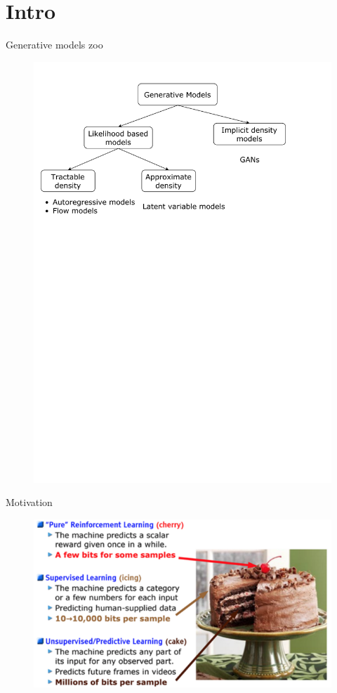 \section{Intro}
\begin{frame}{Generative models zoo}
    \begin{figure}
        \centering
        \includegraphics[width=1.0\linewidth]{figs/generative_models_zoo.pdf}
        \label{fig:generative_models_zoo}
    \end{figure}
\end{frame}
\begin{frame}{Motivation}
    \begin{figure}
        \centering
        \includegraphics[width=\linewidth]{figs/unsupervised_cake.png}
        \label{fig:unsupervised_cake}
    \end{figure}
\end{frame}
